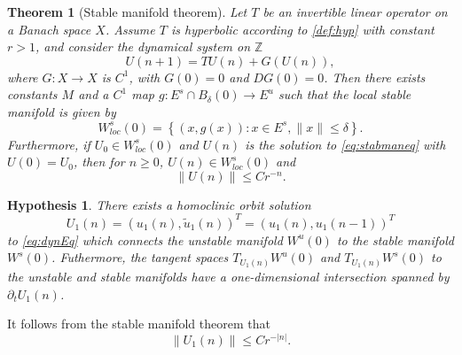 \documentclass[12pt,reqno]{amsart}
\def\Z{{\mathbb Z}}
\newtheorem{theorem}{Theorem}
\newtheorem{hypothesis}{Hypothesis}
\begin{document}
\begin{theorem}[Stable manifold theorem]\label{th:stabman}
Let $T$ be an invertible linear operator on a Banach space $X$. Assume $T$ is hyperbolic according to \cref{def:hyp} with constant $r>1$, and consider the dynamical system on $\Z$
\begin{equation}\label{eq:stabmaneq}
U(n+1) = T U(n) + G(U(n)),
\end{equation}
where $G: X \rightarrow X$ is $C^1$, with $G(0) = 0$ and $DG(0) = 0$.
Then there exists constants $M$ and a $C^1$ map $g: E^s \cap B_\delta(0) \rightarrow E^u$ such that the local stable manifold is given by
\[
W^s_{loc}(0) = \left\{ (x, g(x)) : x \in E^s, \|x\|\leq \delta \right\}.
\]
Furthermore, if $U_0 \in W^s_{loc}(0)$ and $U(n)$ is the solution to \cref{eq:stabmaneq} with $U(0) = U_0$, then for $n \geq 0$, $U(n) \in W^s_{loc}(0)$ and
\[
\| U(n) \| \leq C r^{-n}.
\]
\end{theorem}

\begin{hypothesis}\label{hyp:breatherexists}
There exists a homoclinic orbit solution 
\[
U_1(n) = (u_1(n),\tilde{u}_1(n))^T = (u_1(n),u_1(n-1))^T
\]
to \cref{eq:dynEq} which connects the unstable manifold $W^u(0)$ to the stable manifold $W^s(0)$. Futhermore, the tangent spaces $T_{U_1(n)}W^u(0)$ and $T_{U_1(n)}W^s(0)$ to the unstable and stable manifolds have a one-dimensional intersection spanned by $\partial_t U_1(n)$.
\end{hypothesis}

It follows from the stable manifold theorem that
\begin{equation}\label{eq:U1decayest}
\|U_1(n)\| \leq C r^{-|n|}.
\end{equation}
\end{document}
